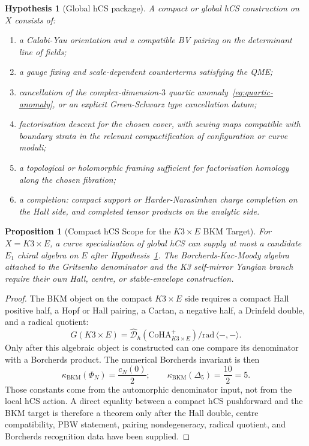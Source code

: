 \documentclass[11pt]{article}
\newtheorem{proposition}[theorem]{Proposition}
\newtheorem{hypothesis}[theorem]{Hypothesis}
\theoremstyle{remark}
\providecommand{\Eone}{E_1}
\providecommand{\CoHA}{\mathrm{CoHA}}
\providecommand{\D}{\mathcal{D}}
\begin{document}
\begin{hypothesis}[Global hCS package]
\label{hyp:global-hcs-package}
A compact or global hCS construction on $X$ consists of:
\begin{enumerate}[label=\textup{(\roman*)}]
  \item a Calabi-Yau orientation and a compatible BV pairing on the
  determinant line of fields;
  \item a gauge fixing and scale-dependent counterterms satisfying the
  QME;
  \item cancellation of the complex-dimension-$3$ quartic
  anomaly~\eqref{eq:quartic-anomaly}, or an explicit Green-Schwarz type
  cancellation datum;
  \item factorisation descent for the chosen cover, with sewing maps
  compatible with boundary strata in the relevant compactification of
  configuration or curve moduli;
  \item a topological or holomorphic framing sufficient for
  factorisation homology along the chosen fibration;
  \item a completion: compact support or Harder-Narasimhan charge
  completion on the Hall side, and completed tensor products on the
  analytic side.
\end{enumerate}
\end{hypothesis}

\begin{proposition}[Compact hCS Scope for the $K3\times E$ BKM Target]
\label{prop:k3e-conditional}
For $X=K3\times E$, a curve specialisation of global hCS can supply at
most a candidate $\Eone$ chiral algebra on $E$ after
Hypothesis~\ref{hyp:global-hcs-package}.  The Borcherds-Kac-Moody
algebra attached to the Gritsenko denominator and the K3 self-mirror
Yangian branch require their own Hall, centre, or stable-envelope
construction.
\end{proposition}

\begin{proof}
The BKM object on the compact $K3\times E$ side requires a compact Hall
positive half, a Hopf or Hall pairing, a Cartan, a negative half, a
Drinfeld double, and a radical quotient:
\[
  G(K3\times E)
  =
  \widehat{\D}_{\hbar}\!\left(\CoHA^+_{K3\times E}\right)
  \big/
  \mathrm{rad}\,\langle-,-\rangle .
  \label{eq:k3e-hall-double}
\]
Only after this algebraic object is constructed can one compare its
denominator with a Borcherds product.  The numerical Borcherds
invariant is then
\[
  \kappa_{\mathrm{BKM}}(\Phi_N)=\frac{c_N(0)}{2};
  \qquad
  \kappa_{\mathrm{BKM}}(\Delta_5)=\frac{10}{2}=5.
  \label{eq:bkm-weight-delta5}
\]
Those constants come from the automorphic denominator input, not from
the local hCS action.  A direct equality between a compact hCS
pushforward and the BKM target is therefore a theorem only after the
Hall double, centre compatibility, PBW statement, pairing
nondegeneracy, radical quotient, and Borcherds recognition data have
been supplied.
\end{proof}
\end{document}
